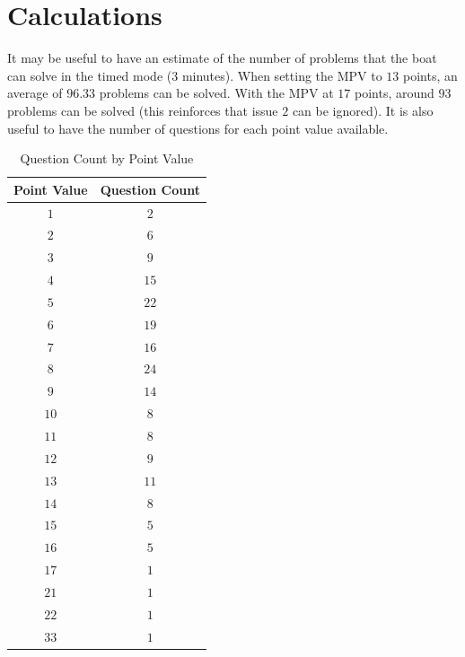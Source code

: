\documentclass{article}
\begin{document}
\section{Calculations}
It may be useful to have an estimate of the number of problems that the boat can solve in the timed mode (3 minutes). When setting the MPV to $13$ points, an average of $96.33$ problems can be solved. With the MPV at $17$ points, around $93$ problems can be solved (this reinforces that issue $2$ can be ignored). It is also useful to have the number of questions for each point value available\autocite{texnique-repo}.
\begin{table}[H]
    \begin{tabular}{|c|c|}
        \hline
        \textbf{Point Value} & \textbf{Question Count} \\
        \hline
        \hline
    
        $1$ & $2$ \\
        $2$ & $6$ \\
        $3$ & $9$ \\
        $4$ & $15$ \\
        $5$ & $22$ \\
        $6$ & $19$ \\
        $7$ & $16$ \\
        $8$ & $24$ \\
        $9$ & $14$ \\
        $10$ & $8$ \\
        $11$ & $8$ \\
        $12$ & $9$ \\
        $13$ & $11$ \\
        $14$ & $8$ \\
        $15$ & $5$ \\
        $16$ & $5$ \\
        $17$ & $1$ \\
        $21$ & $1$ \\
        $22$ & $1$ \\
        $33$ & $1$ \\

        \hline
    \end{tabular}
    \centering
    \caption{Question Count by Point Value}\label{table:question_count}
\end{table}
\end{document}
